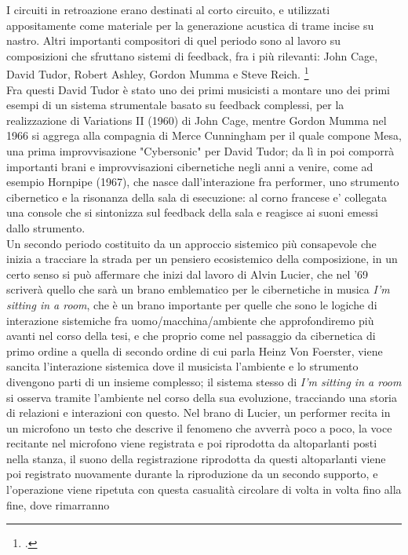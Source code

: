 I circuiti in retroazione erano destinati al corto circuito,
e utilizzati appositamente come materiale per la generazione acustica
di trame incise su nastro.
Altri importanti compositori di quel periodo sono al lavoro su composizioni
che sfruttano sistemi di feedback, fra i più rilevanti:
John Cage, David Tudor, Robert Ashley, Gordon Mumma e Steve Reich. \footcite{sanfilippovallefeedsys} \\
Fra questi David Tudor è stato uno dei primi musicisti a montare uno dei primi esempi di un sistema strumentale
basato su feedback complessi, per la realizzazione di Variations II (1960) di John Cage,
mentre Gordon Mumma nel 1966 si aggrega alla compagnia di Merce Cunningham per il quale compone Mesa, 
una prima improvvisazione "Cybersonic" per David Tudor; da lì in poi comporrà importanti 
brani e improvvisazioni cibernetiche negli anni a venire, come ad esempio Hornpipe (1967), 
che nasce dall'interazione fra performer, uno strumento cibernetico e la risonanza della sala di esecuzione: 
al corno francese e' collegata una console che si sintonizza sul feedback 
della sala e reagisce ai suoni emessi dallo strumento. \\
Un secondo periodo costituito da un approccio sistemico più consapevole
che inizia a tracciare la strada per un pensiero ecosistemico della composizione,
in un certo senso si può affermare che inizi dal lavoro
di Alvin Lucier, che nel '69 scriverà quello che sarà un brano emblematico per
le cibernetiche in musica \textit{I'm sitting in a room},
che è un brano importante per quelle che sono
le logiche di interazione sistemiche fra uomo/macchina/ambiente che approfondiremo 
più avanti nel corso della tesi,
e che proprio come nel passaggio da cibernetica di primo 
ordine a quella di secondo ordine di cui parla Heinz Von Foerster, 
viene sancita l'interazione sistemica dove il musicista l'ambiente e lo strumento
divengono parti di un insieme complesso;
il sistema stesso di \textit{I'm sitting in a room} si osserva tramite l'ambiente 
nel corso della sua evoluzione, tracciando una storia di relazioni e interazioni 
con questo.
Nel brano di Lucier, un performer
recita in un microfono un testo che descrive il fenomeno che avverrà poco a poco,
la voce recitante nel microfono viene registrata e poi riprodotta da altoparlanti
posti nella stanza, il suono della registrazione riprodotta da questi altoparlanti
viene poi registrato nuovamente durante la riproduzione da un secondo supporto, e l'operazione
viene ripetuta con questa casualità circolare di volta in volta
fino alla fine, dove rimarranno
